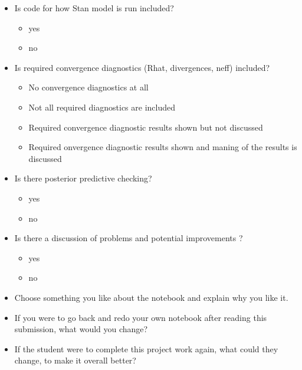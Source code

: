\documentclass[a4paper,11pt]{article}
\begin{document}
\begin{itemize}
  
\item Is code for how Stan model is run included?
  \begin{itemize}
  \item yes
  \item no
  \end{itemize}

  \item Is required convergence diagnostics (Rhat, divergences, neff) included?
    \begin{itemize}
    \item No convergence diagnostics at all
  \item Not all required diagnostics are included
  \item Required convergence diagnostic results shown but not discussed
  \item Required onvergence diagnostic results shown and maning of the results is discussed
  \end{itemize}

\item Is there posterior predictive checking?
  \begin{itemize}
  \item yes
  \item no
  \end{itemize}

\item Is there a discussion of problems and potential improvements ?
  \begin{itemize}
  \item yes
  \item no
  \end{itemize}

\item Choose something you like about the notebook and explain why you like it. 

\item If you were to go back and redo your own notebook after reading this submission, what would you change?

\item If the student were to complete this project work again, what could they change, to make it overall better?
\end{itemize}
\end{document}
